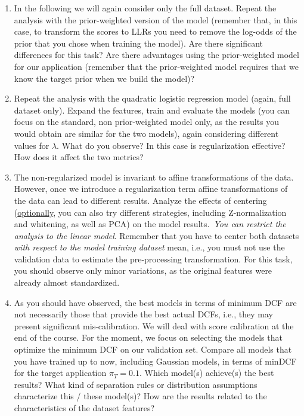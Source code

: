 \documentclass[a4paper, 12pt, english]{article}
\begin{document}
\begin{enumerate}
        \item In the following we will again consider only the full dataset. Repeat the analysis with the prior-weighted version of the model (remember that, in this case, to transform the scores to LLRs you need to remove the log-odds of the prior that you chose when training the model). Are there significant differences for this task? Are there advantages using the prior-weighted model for our application (remember that the prior-weighted model requires that we know the target prior when we build the model)?
        \item Repeat the analysis with the quadratic logistic regression model (again, full dataset only). Expand the features, train and evaluate the models (you can focus on the standard, non prior-weighted model only, as the results you would obtain are similar for the two models), again considering different values for \(\lambda\). What do you observe? In this case is regularization effective? How does it affect the two metrics?
        \item The non-regularized model is invariant to affine transformations of the data. However, once we introduce a regularization term affine transformations of the data can lead to different results. Analyze the effects of centering (\underline{optionally}, you can also try different strategies, including Z-normalization and whitening, as well as PCA) on the model results.\ \textit{You can restrict the analysis to the linear model}. Remember that you have to center both datasets \textit{with respect to the model training dataset} mean, i.e., you must not use the validation data to estimate the pre-processing transformation. For this task, you should observe only minor variations, as the original features were already almost standardized.
        \item As you should have observed, the best models in terms of minimum DCF are not necessarily those that provide the best actual DCFs, i.e., they may present significant mis-calibration. We will deal with score calibration at the end of the course. For the moment, we focus on selecting the models that optimize the minimum DCF on our validation set. Compare all models that you have trained up to now, including Gaussian models, in terms of minDCF for the target application \(\pi_T = 0.1\). Which model(s) achieve(s) the best results? What kind of separation rules or distribution assumptions characterize this / these model(s)? How are the results related to the characteristics of the dataset features?
    \end{enumerate}
\end{document}
